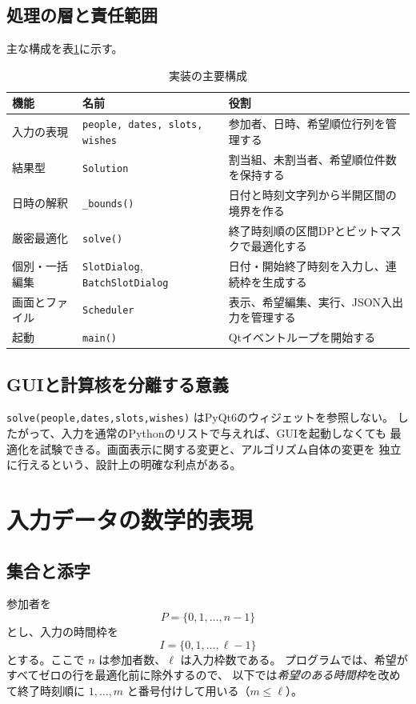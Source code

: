 \documentclass[11pt,a4paper]{ltjsarticle}
\theoremstyle{definition}
\theoremstyle{remark}
\newcommand{\code}[1]{\texttt{#1}}
\begin{document}
\subsection{処理の層と責任範囲}
主な構成を表\ref{tab:modules}に示す。
\begin{table}[htbp]
\centering\small
\caption{実装の主要構成}
\label{tab:modules}
\begin{tabularx}{\linewidth}{p{34mm}p{42mm}X}
\toprule
機能 & 名前 & 役割 \\
\midrule
入力の表現 & \code{people, dates, slots, wishes} & 参加者、日時、希望順位行列を管理する \\
結果型 & \code{Solution} & 割当組、未割当者、希望順位件数を保持する \\
日時の解釈 & \code{\_bounds()} & 日付と時刻文字列から半開区間の境界を作る \\
厳密最適化 & \code{solve()} & 終了時刻順の区間DPとビットマスクで最適化する \\
個別・一括編集 & \code{SlotDialog}, \code{BatchSlotDialog} & 日付・開始終了時刻を入力し、連続枠を生成する \\
画面とファイル & \code{Scheduler} & 表示、希望編集、実行、JSON入出力を管理する \\
起動 & \code{main()} & Qtイベントループを開始する \\
\bottomrule
\end{tabularx}
\end{table}

\subsection{GUIと計算核を分離する意義}
\code{solve(people,dates,slots,wishes)} はPyQt6のウィジェットを参照しない。
したがって、入力を通常のPythonのリストで与えれば、GUIを起動しなくても
最適化を試験できる。画面表示に関する変更と、アルゴリズム自体の変更を
独立に行えるという、設計上の明確な利点がある。

\section{入力データの数学的表現}
\subsection{集合と添字}
参加者を
\[
 P=\{0,1,\ldots,n-1\}
\]
とし、入力の時間枠を
\[
 I=\{0,1,\ldots,\ell-1\}
\]
とする。ここで $n$ は参加者数、$\ell$ は入力枠数である。
プログラムでは、希望がすべてゼロの行を最適化前に除外するので、
以下では\emph{希望のある時間枠}を改めて終了時刻順に
$1,\ldots,m$ と番号付けして用いる（$m\leq\ell$）。
\end{document}
